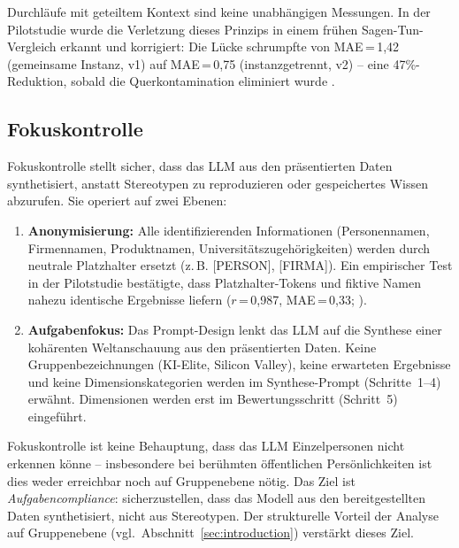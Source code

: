 \documentclass[11pt,a4paper]{article}
\begin{document}
Durchl\"aufe mit geteiltem Kontext sind keine unabh\"angigen Messungen. In der Pilotstudie wurde die Verletzung dieses Prinzips in einem fr\"uhen Sagen-Tun-Vergleich erkannt und korrigiert: Die L\"ucke schrumpfte von MAE\,=\,1,42 (gemeinsame Instanz, v1) auf MAE\,=\,0,75 (instanzgetrennt, v2) -- eine 47\%-Reduktion, sobald die Querkontamination eliminiert wurde \citep{Geiger2026PaperA}.


\subsection{Fokuskontrolle}
\label{sec:method:focus}

Fokuskontrolle stellt sicher, dass das LLM aus den pr\"asentierten Daten synthetisiert, anstatt Stereotypen zu reproduzieren oder gespeichertes Wissen abzurufen. Sie operiert auf zwei Ebenen:

\begin{enumerate}[nosep]
  \item \textbf{Anonymisierung:} Alle identifizierenden Informationen (Personennamen, Firmennamen, Produktnamen, Universit\"atszugeh\"origkeiten) werden durch neutrale Platzhalter ersetzt (z.\,B. [PERSON], [FIRMA]). Ein empirischer Test in der Pilotstudie best\"atigte, dass Platzhalter-Tokens und fiktive Namen nahezu identische Ergebnisse liefern ($r$\,=\,0,987, MAE\,=\,0,33; \citealp{Geiger2026PaperA}).
  \item \textbf{Aufgabenfokus:} Das Prompt-Design lenkt das LLM auf die Synthese einer koh\"arenten Weltanschauung aus den pr\"asentierten Daten. Keine Gruppenbezeichnungen (\glqq{}KI-Elite\grqq{}, \glqq{}Silicon Valley\grqq{}), keine erwarteten Ergebnisse und keine Dimensionskategorien werden im Synthese-Prompt (Schritte~1--4) erw\"ahnt. Dimensionen werden erst im Bewertungsschritt (Schritt~5) eingef\"uhrt.
\end{enumerate}

Fokuskontrolle ist keine Behauptung, dass das LLM Einzelpersonen nicht erkennen k\"onne -- insbesondere bei ber\"uhmten \"offentlichen Pers\"onlichkeiten ist dies weder erreichbar noch auf Gruppenebene n\"otig. Das Ziel ist \emph{Aufgabencompliance}: sicherzustellen, dass das Modell aus den bereitgestellten Daten synthetisiert, nicht aus Stereotypen. Der strukturelle Vorteil der Analyse auf Gruppenebene (vgl.\ Abschnitt~\ref{sec:introduction}) verst\"arkt dieses Ziel.


\end{document}
